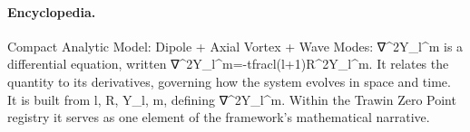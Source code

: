 \paragraph{Encyclopedia.}
Compact Analytic Model: Dipole + Axial Vortex + Wave Modes: ∇\textasciicircum{}2Y\_l\textasciicircum{}m is a differential equation, written ∇\textasciicircum{}2Y\_l\textasciicircum{}m=-tfracl(l+1)R\textasciicircum{}2Y\_l\textasciicircum{}m. It relates the quantity to its derivatives, governing how the system evolves in space and time. It is built from l, R, Y\_l, m, defining ∇\textasciicircum{}2Y\_l\textasciicircum{}m. Within the Trawin Zero Point registry it serves as one element of the framework's mathematical narrative.
